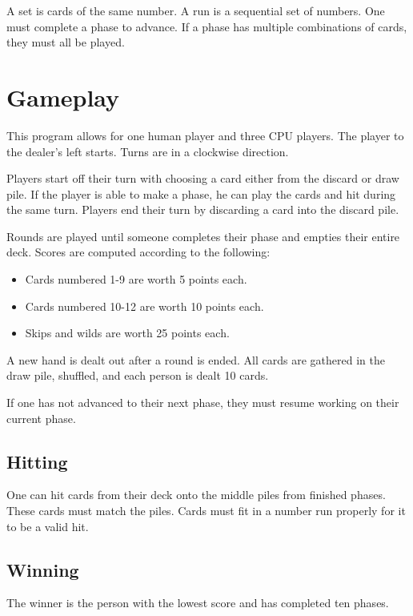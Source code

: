\documentclass[12pt]{article}
\begin{document}
A set is cards of the same number. A run is a sequential set of numbers.
One must complete a phase to advance. If a phase has multiple combinations of cards, they
must all be played.

\section{Gameplay}
This program allows for one human player and three CPU players.
The player to the dealer's left starts. Turns are in a clockwise direction.

Players start off their turn with choosing a card either from the discard or draw pile.
If the player is able to make a phase, he can play the cards and hit during the same
turn. Players end their turn by discarding a card into the discard pile.

Rounds are played until someone completes their phase and empties their entire deck.
Scores are computed according to the following:

\begin{itemize}
	\item Cards numbered 1-9 are worth 5 points each.
	\item Cards numbered 10-12 are worth 10 points each.
	\item Skips and wilds are worth 25 points each.
\end{itemize}

A new hand is dealt out after a round is ended. All cards are gathered in the draw pile,
shuffled, and each person is dealt 10 cards.

If one has not advanced to their next phase, they must resume working on their current
phase.

\subsection{Hitting}
One can hit cards from their deck onto the middle piles from finished phases. These cards
must match the piles. Cards must fit in a number run properly for it to be a valid hit.

\subsection{Winning}
The winner is the person with the lowest score and has completed ten phases.
\end{document}
